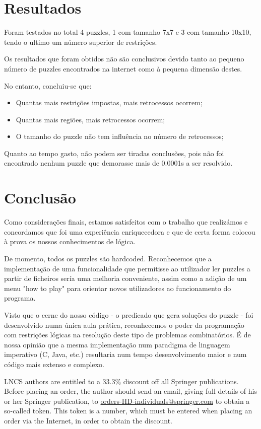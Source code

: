 \documentclass[runningheads,a4paper]{llncs}
\begin{document}
\section{Resultados}

Foram testados no total 4 puzzles, 1 com tamanho 7x7 e 3 com tamanho 10x10, tendo o ultimo um número superior de restrições.

Os resultados que foram obtidos não são conclusivos devido tanto ao pequeno número de puzzles encontrados na internet como à pequena dimensão destes.

No entanto, concluiu-se que:

\begin{itemize}
  \item Quantas mais restrições impostas, mais retrocessos ocorrem;
  \item Quantas mais regiões, mais retrocessos ocorrem;
  \item O tamanho do puzzle não tem influência no número de retrocessos;
\end{itemize}

Quanto ao tempo gasto, não podem ser tiradas conclusões, pois não foi encontrado nenhum puzzle que demorasse mais de 0.0001s a ser resolvido.



\section{Conclusão}

Como considerações finais, estamos satisfeitos com o trabalho que realizámos e concordamos que foi uma experiência enriquecedora e que de certa forma colocou à prova os nossos conhecimentos de lógica.

De momento, todos os puzzles são hardcoded. Reconhecemos que a implementação de uma funcionalidade que permitisse ao utilizador ler puzzles a partir de ficheiros sería uma melhoria conveniente, assim como a adição de um menu "how to play" para orientar novos utilizadores ao funcionamento do programa.

Visto que o cerne do nosso código - o predicado que gera soluções do puzzle - foi desenvolvido numa única aula prática, reconhecemos o poder da programação com restrições lógicas na resolução deste tipo de problemas combinatórios. É de nossa opinião que a mesma implementação num paradigma de linguagem imperativo (C, Java, etc.) resultaria num tempo desenvolvimento maior e num código mais extenso e complexo.

LNCS authors are entitled to a 33.3\% discount off all Springer
publications. Before placing an order, the author should send an email, 
giving full details of his or her Springer publication,
to \url{orders-HD-individuals@springer.com} to obtain a so-called token. This token is a
number, which must be entered when placing an order via the Internet, in
order to obtain the discount.
\end{document}
